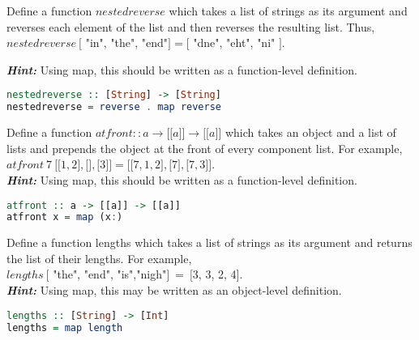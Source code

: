 \documentclass{article}
\begin{document}
\begin{Exercise} [difficulty=4]
Define a function $nestedreverse$ which takes a list of strings as its argument
and reverses each element of the list and then reverses the resulting list. Thus, \\
$nestedreverse \ \lbrack$ "in", "the", "end"$ \rbrack = \lbrack$ "dne", "eht", "ni" $\rbrack$.

\textbf{\textit{Hint:}} Using map, this should be written as a function-level definition. 
\end{Exercise} 
\begin{Answer}
\begin{lstlisting}[language=Haskell]
nestedreverse :: [String] -> [String]
nestedreverse = reverse . map reverse
\end{lstlisting}
\end{Answer}
\pagebreak

\begin{Exercise} [difficulty=4]
Define a function $atfront :: a \rightarrow \lbrack \lbrack  a \rbrack \rbrack \rightarrow  \lbrack \lbrack  a \rbrack \rbrack$  which takes an object and a list of lists and prepends  the object at the front of every component list. For example, \\
$atfront \ 7 \ \lbrack \lbrack 1,2 \rbrack , \lbrack \rbrack , \lbrack 3\rbrack \rbrack = \lbrack \lbrack 7,1,2 \rbrack, \lbrack 7 \rbrack, \lbrack7,3\rbrack \rbrack$. \\
\textbf{\textit{Hint:}} Using map, this should be written as a function-level definition. 
\end{Exercise} 
\begin{Answer}
\begin{lstlisting}[language=Haskell]
atfront :: a -> [[a]] -> [[a]]
atfront x = map (x:) 
\end{lstlisting}
\end{Answer}


\begin{Exercise} [difficulty=3]
Define a function lengths which takes a list of strings as its argument and returns the list of their lengths. For example, \\
$lengths \  \lbrack$ "the", "end", "is","nigh"$ \rbrack \ = \ \lbrack $3, 3, 2, 4$\rbrack$. \\
\textbf{\textit{Hint:}} Using map, this may be written as an object-level definition. 
\end{Exercise} 
\begin{Answer}
\begin{lstlisting}[language=Haskell]
lengths :: [String] -> [Int]
lengths = map length
\end{lstlisting}
\end{Answer}
\end{document}
